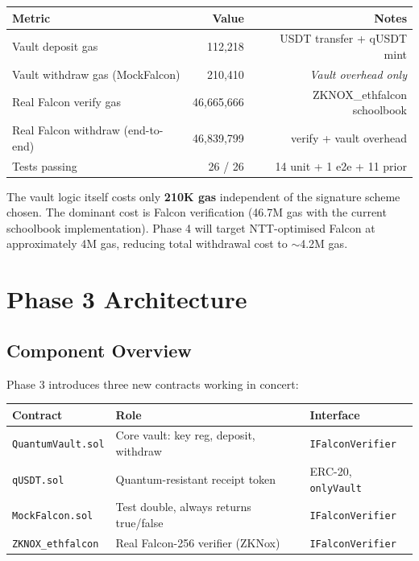 \documentclass[11pt,a4paper]{article}
\begin{document}
\begin{center}
\begin{tabular}{lrr}
\toprule
\textbf{Metric} & \textbf{Value} & \textbf{Notes} \\
\midrule
Vault deposit gas & 112,218 & USDT transfer + qUSDT mint \\
Vault withdraw gas (MockFalcon) & 210,410 & \textit{Vault overhead only} \\
Real Falcon verify gas & 46,665,666 & ZKNOX\_ethfalcon schoolbook \\
Real Falcon withdraw (end-to-end) & 46,839,799 & verify + vault overhead \\
Tests passing & 26 / 26 & 14 unit + 1 e2e + 11 prior \\
\bottomrule
\end{tabular}
\end{center}

\vspace{0.4cm}

The vault logic itself costs only \textbf{210K gas} independent of the signature scheme chosen. The dominant cost is Falcon verification (46.7M gas with the current schoolbook implementation). Phase 4 will target NTT-optimised Falcon at approximately 4M gas, reducing total withdrawal cost to $\sim$4.2M gas.

\newpage
\section{Phase 3 Architecture}

\subsection{Component Overview}

Phase 3 introduces three new contracts working in concert:

\begin{center}
\begin{tabular}{lll}
\toprule
\textbf{Contract} & \textbf{Role} & \textbf{Interface} \\
\midrule
\texttt{QuantumVault.sol} & Core vault: key reg, deposit, withdraw & \texttt{IFalconVerifier} \\
\texttt{qUSDT.sol} & Quantum-resistant receipt token & ERC-20, \texttt{onlyVault} \\
\texttt{MockFalcon.sol} & Test double, always returns true/false & \texttt{IFalconVerifier} \\
\texttt{ZKNOX\_ethfalcon} & Real Falcon-256 verifier (ZKNox) & \texttt{IFalconVerifier} \\
\bottomrule
\end{tabular}
\end{center}
\end{document}
